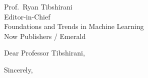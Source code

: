 \documentclass[11pt,a4paper]{letter}
\begin{document}
\begin{letter}{Prof.\ Ryan Tibshirani \\ Editor-in-Chief \\ Foundations and Trends in Machine Learning \\ Now Publishers / Emerald}

\opening{Dear Professor Tibshirani,}


\closing{Sincerely,}

\end{letter}
\end{document}
